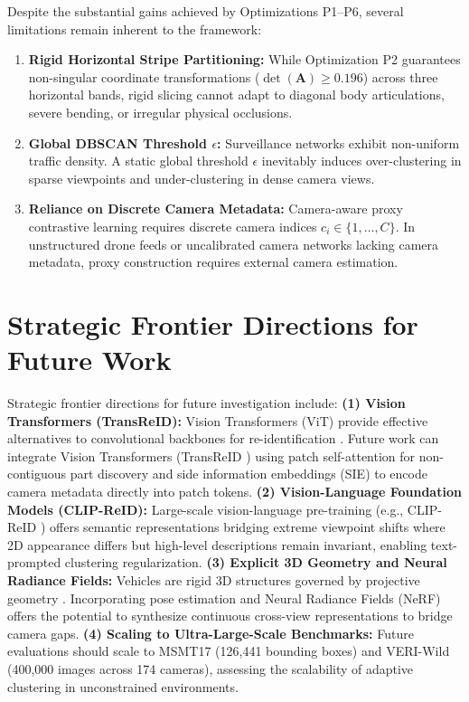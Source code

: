 Despite the substantial gains achieved by Optimizations P1--P6, several limitations remain inherent to the framework:
\begin{enumerate}[itemsep=0.5pt,parsep=0pt,topsep=1pt]
    \item \textbf{Rigid Horizontal Stripe Partitioning:} While Optimization P2 guarantees non-singular coordinate transformations ($\det(\mathbf{A}) \ge 0.196$) across three horizontal bands, rigid slicing cannot adapt to diagonal body articulations, severe bending, or irregular physical occlusions.
    \item \textbf{Global DBSCAN Threshold $\epsilon$:} Surveillance networks exhibit non-uniform traffic density. A static global threshold $\epsilon$ inevitably induces over-clustering in sparse viewpoints and under-clustering in dense camera views.
    \item \textbf{Reliance on Discrete Camera Metadata:} Camera-aware proxy contrastive learning requires discrete camera indices $c_i \in \{1, \dots, C\}$. In unstructured drone feeds or uncalibrated camera networks lacking camera metadata, proxy construction requires external camera estimation.
\end{enumerate}

\section{Strategic Frontier Directions for Future Work}
\label{sec:future_work}

Strategic frontier directions for future investigation include: \textbf{(1) Vision Transformers (TransReID):} Vision Transformers (ViT) provide effective alternatives to convolutional backbones for re-identification \cite{he2021transreid}. Future work can integrate Vision Transformers (TransReID \cite{he2021transreid}) using patch self-attention for non-contiguous part discovery and side information embeddings (SIE) to encode camera metadata directly into patch tokens. \textbf{(2) Vision-Language Foundation Models (CLIP-ReID):} Large-scale vision-language pre-training (e.g., CLIP-ReID \cite{li2023clipreid}) offers semantic representations bridging extreme viewpoint shifts where 2D appearance differs but high-level descriptions remain invariant, enabling text-prompted clustering regularization. \textbf{(3) Explicit 3D Geometry and Neural Radiance Fields:} Vehicles are rigid 3D structures governed by projective geometry \cite{wang2017orientation, khorramshahi2019dual}. Incorporating pose estimation and Neural Radiance Fields (NeRF) offers the potential to synthesize continuous cross-view representations to bridge camera gaps. \textbf{(4) Scaling to Ultra-Large-Scale Benchmarks:} Future evaluations should scale to MSMT17 \cite{wei2018msmt17} (126,441 bounding boxes) and VERI-Wild \cite{lou2019veriwide} (400,000 images across 174 cameras), assessing the scalability of adaptive clustering in unconstrained environments.

